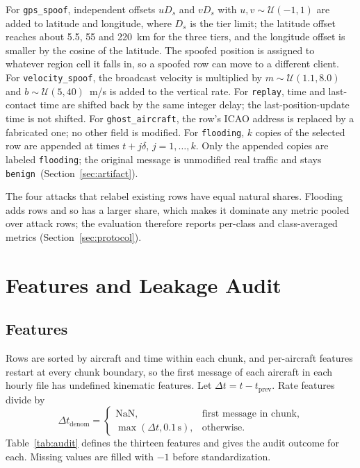 \documentclass[conference]{IEEEtran}
\newcommand{\benign}{\texttt{benign}}
\newcommand{\gps}{\texttt{gps\_spoof}}
\newcommand{\vel}{\texttt{velocity\_spoof}}
\newcommand{\replay}{\texttt{replay}}
\newcommand{\ghost}{\texttt{ghost\_aircraft}}
\newcommand{\flood}{\texttt{flooding}}
\begin{document}
For \gps, independent offsets $uD_s$ and $vD_s$ with $u,v\sim\mathcal{U}(-1,1)$ are added to latitude and longitude, where $D_s$ is the tier limit; the latitude offset reaches about 5.5, 55 and 220~km for the three tiers, and the longitude offset is smaller by the cosine of the latitude. The spoofed position is assigned to whatever region cell it falls in, so a spoofed row can move to a different client. For \vel, the broadcast velocity is multiplied by $m\sim\mathcal{U}(1.1,8.0)$ and $b\sim\mathcal{U}(5,40)$~m/s is added to the vertical rate. For \replay, time and last-contact time are shifted back by the same integer delay; the last-position-update time is not shifted. For \ghost, the row's ICAO address is replaced by a fabricated one; no other field is modified. For \flood, $k$ copies of the selected row are appended at times $t+j\delta$, $j=1,\dots,k$. Only the appended copies are labeled \flood; the original message is unmodified real traffic and stays \benign\ (Section~\ref{sec:artifact}).

The four attacks that relabel existing rows have equal natural shares. Flooding adds rows and so has a larger share, which makes it dominate any metric pooled over attack rows; the evaluation therefore reports per-class and class-averaged metrics (Section~\ref{sec:protocol}).

\section{Features and Leakage Audit}\label{sec:features}

\subsection{Features}
Rows are sorted by aircraft and time within each chunk, and per-aircraft features restart at every chunk boundary, so the first message of each aircraft in each hourly file has undefined kinematic features. Let $\Delta t=t-t_{\mathrm{prev}}$. Rate features divide by
\begin{equation}\Delta t_{\mathrm{denom}}=\begin{cases}\mathrm{NaN},&\text{first message in chunk},\\\max(\Delta t,0.1\,\mathrm{s}),&\text{otherwise.}\end{cases}\label{eq:denom}\end{equation}
Table~\ref{tab:audit} defines the thirteen features and gives the audit outcome for each. Missing values are filled with $-1$ before standardization.
\end{document}
